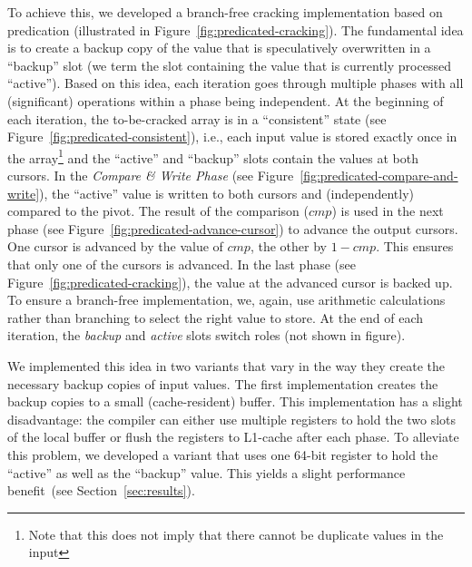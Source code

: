 To achieve this, we developed a branch-free cracking implementation
based on predication (illustrated in
Figure~\ref{fig:predicated-cracking}). The fundamental idea is to
create a backup copy of the value that is speculatively overwritten in
a ``backup'' slot (we term the slot containing the value that is
currently processed ``active''). Based on this idea, each iteration
goes through multiple phases with all (significant) operations within
a phase being independent. At the beginning of each iteration, the
to-be-cracked array is in a ``consistent'' state (see
Figure~\ref{fig:predicated-consistent}), i.e., each input value is
stored exactly once in the array\footnote{Note that this does not
  imply that there cannot be duplicate values in the input} and the
``active'' and ``backup'' slots contain the values at both cursors.
In the \emph{Compare \& Write Phase} (see
Figure~\ref{fig:predicated-compare-and-write}), the ``active'' value
is written to both cursors and (independently) compared to the
pivot. The result of the comparison ($cmp$) is used in the next phase
(see Figure~\ref{fig:predicated-advance-cursor}) to advance the output
cursors. One cursor is advanced by the value of $cmp$, the other by
$1-cmp$. This ensures that only one of the cursors is advanced. In the
last phase (see Figure~\ref{fig:predicated-cracking}), the value at
the advanced cursor is backed up. To ensure a branch-free
implementation, we, again, use arithmetic calculations rather than
branching to select the right value to store. At the end of each
iteration, the \emph{backup} and \emph{active} slots switch roles (not
shown in figure).


We implemented this idea in two variants that vary in the way they
create the necessary backup copies of input values. The first
implementation creates the backup copies to a small (cache-resident)
buffer. This implementation has a slight disadvantage: the
compiler can either use multiple registers to hold the two slots of
the local buffer or flush the registers to L1-cache after each
phase. To alleviate this problem, we developed a variant that uses one
64-bit register to hold the ``active'' as well as the ``backup''
value. This yields a slight performance benefit~(see
Section~\ref{sec:results}).


